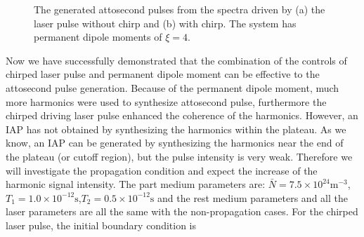 \documentclass[10pt,letterpaper]{article}
\begin{document}
\begin{figure}[!htbp]
	\centering
	\caption{The generated attosecond pulses from the spectra driven by (a) the laser pulse without chirp and (b) with chirp. The system has permanent dipole moments of $ \xi=4 $.}
	\label{fig5}
\end{figure}	

Now we have successfully demonstrated that the combination of the controls of chirped laser pulse and permanent dipole moment can be effective to the attosecond pulse generation. Because of the permanent dipole moment, much more harmonics were used to synthesize attosecond pulse, furthermore the chirped driving laser pulse enhanced the coherence of the harmonics. However, an IAP has not obtained by synthesizing the harmonics within the plateau. As we know, an IAP can be generated by synthesizing the harmonics near the end of the plateau (or cutoff region), but the pulse intensity is very weak. Therefore we will investigate the propagation condition and expect the increase of the harmonic signal intensity. The part medium parameters are: $ \bar{N}=7.5\times10^{24} \textrm{m}^{-3}$, $ T_{1}=1.0\times10^{-12} \textrm{s} $,$ T_{2}=0.5\times10^{-12} \textrm{s} $ \cite{Kalosha-Two-Level-PRL-1999} and the rest medium parameters and all the laser parameters are all the same with the non-propagation cases. For the chirped laser pulse, the initial boundary condition is
\end{document}
